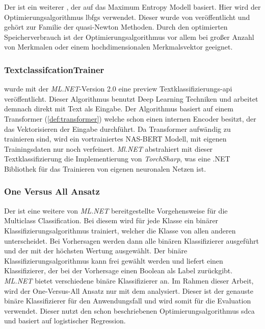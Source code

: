 Der  ist ein weiterer , der auf das Maximum Entropy Modell basiert. Hier wird der Optimierungsalgorithmus \ac{lbfgs} verwendet. Dieser wurde \citeyear{Liu1989OnTL} von \citeauthor{Liu1989OnTL} veröffentlicht und gehört zur Familie der quasi-Newton Methoden. Durch den optimierten Speicherverbrauch ist der Optimierungsalgorithmus vor allem bei großer Anzahl von Merkmalen oder einem hochdimensionalen Merkmalsvektor geeignet. \citep[vgl.][]{lbfgstrainer_doc2022}

\subsubsection{TextclassifcationTrainer}
\label{c:conception:classification:multiclass:textclassification}
\citeyear{mlnet_textclassification2022} wurde mit der \textit{ML.NET}-Version 2.0 eine preview Textklassifizierungs-\ac{api} veröffentlicht. Dieser Algorithmus benutzt Deep Learning Techniken und arbeitet demnach direkt mit Text als Eingabe. Der Algorithmus basiert auf einem Transformer (\autoref{def:transformer}) welche schon einen internen Encoder besitzt, der das Vektorisieren der Eingabe durchführt. Da Transformer aufwändig zu trainieren sind, wird ein vortrainiertes NAS-BERT Modell, mit eigenen Trainingsdaten nur noch verfeinert. \textit{Ml.NET} abstrahiert mit dieser Textklassifizierung die Implementierung von \textit{TorchSharp}, was eine .NET Bibliothek für das Trainieren von eigenen neuronalen Netzen ist. \citep[vgl.][]{mlnet_textclassification2022}
\subsubsection{One Versus All Ansatz}
\label{c:conception:classification:multiclass:onevsall}
Der  ist eine weitere von \textit{ML.NET} bereitgestellte Vorgehensweise für die Multiclass Classification. Bei diesem wird für jede Klasse ein binärer Klassifizierungsalgorithmus trainiert, welcher die Klasse von allen anderen unterscheidet. Bei Vorhersagen werden dann alle binären Klassifizierer ausgeführt und der mit der höchsten Wertung ausgewählt. Der binäre Klassifizierungsalgorithmus kann frei gewählt werden und liefert einen Klassifizierer, der bei der Vorhersage einen Boolean als Label zurückgibt. \citep[vgl.][]{oneversusall_doc} \textit{ML.NET} bietet verschiedene binäre Klassifizierer an. Im Rahmen dieser Arbeit, wird der One-Versus-All Ansatz nur mit dem  analysiert. Dieser ist der genauste binäre Klassifizierer für den Anwendungsfall und wird somit für die Evaluation verwendet. Dieser nutzt den schon beschriebenen Optimierungsalgorithmus \ac{sdca} und basiert auf logistischer Regression. \citep[vgl.][]{scdabinary_doc}

